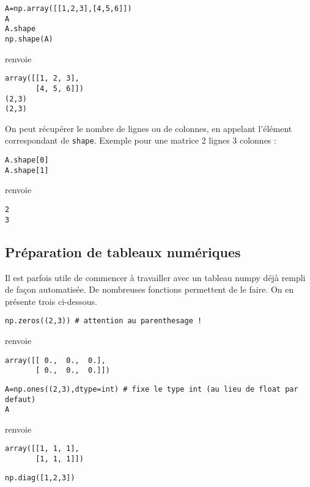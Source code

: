 \begin{verbatim}
A=np.array([[1,2,3],[4,5,6]])
A
A.shape
np.shape(A)
\end{verbatim}

renvoie 

\begin{verbatim}
array([[1, 2, 3],
       [4, 5, 6]])
(2,3)
(2,3)
\end{verbatim}

On peut récupérer le nombre de lignes ou de colonnes, en appelant l'élément correspondant de \verb|shape|. Exemple pour une matrice 2 lignes 3 colonnes :

\begin{verbatim}
A.shape[0]
A.shape[1]
\end{verbatim}

renvoie 

\begin{verbatim}
2
3
\end{verbatim} 

\subsection{Préparation de tableaux numériques}

Il est parfois utile de commencer à travailler avec un tableau numpy déjà rempli de façon automatisée. De nombreuses fonctions permettent de le faire. On en présente trois ci-dessous.

\begin{verbatim}
np.zeros((2,3)) # attention au parenthesage !
\end{verbatim}

renvoie 

\begin{verbatim}
array([[ 0.,  0.,  0.],
       [ 0.,  0.,  0.]])
\end{verbatim} 

\begin{verbatim}
A=np.ones((2,3),dtype=int) # fixe le type int (au lieu de float par defaut)
A
\end{verbatim}

renvoie 

\begin{verbatim}
array([[1, 1, 1],
       [1, 1, 1]])
\end{verbatim} 

\begin{verbatim}
np.diag([1,2,3])
\end{verbatim}

